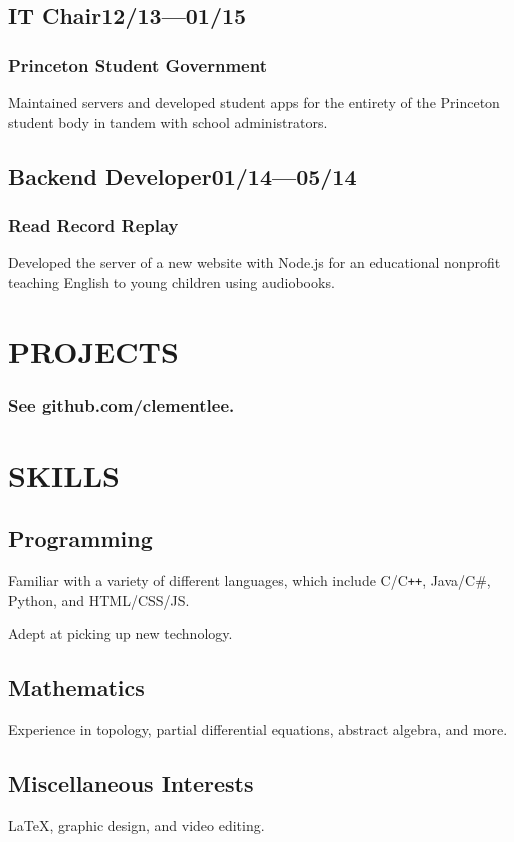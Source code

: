 \documentclass[11pt]{article}
\begin{document}
\begin{multicols}{2}
\subsection*{IT Chair\hfill\textnormal{12/13---01/15}}
\subsubsection*{Princeton Student Government}
Maintained servers and developed student apps for the entirety of the Princeton student body in tandem with school administrators.

\subsection*{Backend Developer\hfill\textnormal{01/14---05/14}}
\subsubsection*{Read Record Replay}
Developed the server of a new website with Node.js for an educational nonprofit teaching English to young children using audiobooks.

\section*{PROJECTS}
\vspace{-0.5\baselineskip}
\subsubsection*{See github.com/clementlee.}

\vspace{2\baselineskip}


\section*{SKILLS}

\subsection*{Programming}
Familiar with a variety of different languages, which include C/C{}\verb!++!, Java/C\#, Python, and HTML/CSS/JS.

Adept at picking up new technology.

\subsection*{Mathematics}
Experience in topology, partial differential equations, abstract algebra, and more.

\subsection*{Miscellaneous Interests}
LaTeX, graphic design, and video editing.

\end{multicols}
\end{document}
